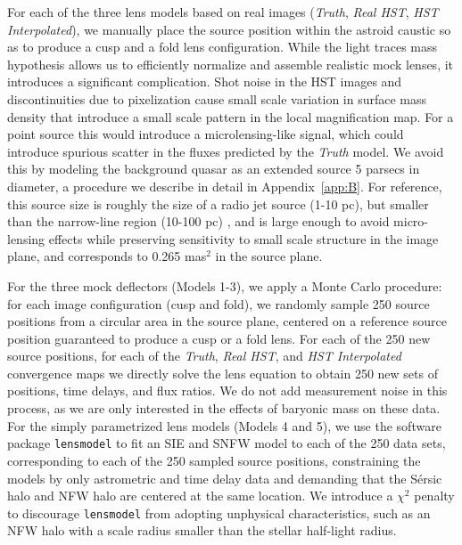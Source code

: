 For each of the three lens models based on real images (\textit{Truth}, \textit{Real HST}, \textit{HST Interpolated}), we manually place the source position within the astroid caustic so as to produce a cusp and a fold lens configuration. While the light traces mass hypothesis allows us to efficiently normalize and assemble realistic mock lenses, it introduces a significant complication. Shot noise in the HST images and discontinuities due to pixelization cause small scale variation in surface mass density that introduce a small scale pattern in the local magnification map. For a point source this would introduce a microlensing-like signal, which could introduce spurious scatter in the fluxes predicted by the \textit{Truth} model. We avoid this by modeling the background quasar as an extended source 5 parsecs in diameter, a procedure we describe in detail in Appendix~\ref{app:B}. For reference, this source size is roughly the size of a radio jet source (1-10 pc), but smaller than the narrow-line region (10-100 pc) \citep{MoustakasMetcalf02}, and is large enough to avoid micro-lensing effects while preserving sensitivity to small scale structure in the image plane, and corresponds to 0.265 mas$^2$ in the source plane.

For the three mock deflectors (Models 1-3), we apply a Monte Carlo procedure: for each image configuration (cusp and fold), we randomly sample 250 source positions from a circular area in the source plane, centered on a reference source position guaranteed to produce a cusp or a fold lens. For each of the 250 new source positions, for each of the \textit{Truth}, \textit{Real HST}, and \textit{HST Interpolated} convergence maps we directly solve the lens equation to obtain 250 new sets of positions, time delays, and flux ratios. We do not add measurement noise in this process, as we are only interested in the effects of baryonic mass on these data. 
\newline \indent For the simply parametrized lens models (Models 4 and 5), we use the software package {\tt{lensmodel}} to fit an SIE and SNFW model to each of the 250 data sets, corresponding to each of the 250 sampled source positions, constraining the models by only astrometric and time delay data and demanding that the S{\'e}rsic halo and NFW halo are centered at the same location. We introduce a $\chi^2$ penalty to discourage {\tt{lensmodel}} from adopting unphysical characteristics, such as an NFW halo with a scale radius smaller than the stellar half-light radius.

